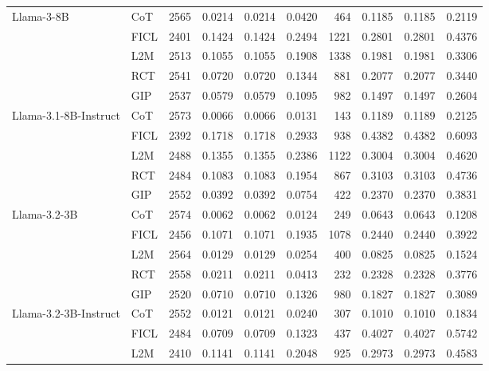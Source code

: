 \documentclass[conference]{IEEEtran}
\begin{document}
\begin{table}[t]
\begin{tabular}{@{} p{3.5cm} l r r r r r r r r@{}}
\addlinespace
Llama-3-8B                   & CoT & 2565 & 0.0214 & 0.0214 & 0.0420 & 464 & 0.1185 & 0.1185 & 0.2119 \\
                          & FICL & 2401 & 0.1424 & 0.1424 & 0.2494 & 1221 & 0.2801 & 0.2801 & 0.4376 \\
                          & L2M  & 2513 & 0.1055 & 0.1055 & 0.1908 & 1338 & 0.1981 & 0.1981 & 0.3306 \\
                          & RCT  & 2541 & 0.0720 & 0.0720 & 0.1344 & 881 & 0.2077 & 0.2077 & 0.3440 \\
                          & GIP  & 2537 & 0.0579 & 0.0579 & 0.1095 & 982 & 0.1497 & 0.1497 & 0.2604 \\ \hline
\addlinespace
Llama-3.1-8B-Instruct       & CoT & 2573 & 0.0066 & 0.0066 & 0.0131 & 143 & 0.1189 & 0.1189 & 0.2125 \\
                          & FICL & 2392 & 0.1718 & 0.1718 & 0.2933 & 938 & 0.4382 & 0.4382 & 0.6093 \\
                          & L2M  & 2488 & 0.1355 & 0.1355 & 0.2386 & 1122 & 0.3004 & 0.3004 & 0.4620 \\
                          & RCT  & 2484 & 0.1083 & 0.1083 & 0.1954 & 867 & 0.3103 & 0.3103 & 0.4736 \\
                          & GIP  & 2552 & 0.0392 & 0.0392 & 0.0754 & 422 & 0.2370 & 0.2370 & 0.3831 \\ \hline
\addlinespace
Llama-3.2-3B                 & CoT & 2574 & 0.0062 & 0.0062 & 0.0124 & 249 & 0.0643 & 0.0643 & 0.1208 \\
                          & FICL & 2456 & 0.1071 & 0.1071 & 0.1935 & 1078 & 0.2440 & 0.2440 & 0.3922 \\
                          & L2M  & 2564 & 0.0129 & 0.0129 & 0.0254 & 400 & 0.0825 & 0.0825 & 0.1524 \\
                          & RCT  & 2558 & 0.0211 & 0.0211 & 0.0413 & 232 & 0.2328 & 0.2328 & 0.3776 \\
                          & GIP  & 2520 & 0.0710 & 0.0710 & 0.1326 & 980 & 0.1827 & 0.1827 & 0.3089 \\ \hline
\addlinespace
Llama-3.2-3B-Instruct       & CoT & 2552 & 0.0121 & 0.0121 & 0.0240 & 307 & 0.1010 & 0.1010 & 0.1834 \\
                          & FICL & 2484 & 0.0709 & 0.0709 & 0.1323 & 437 & 0.4027 & 0.4027 & 0.5742 \\
                          & L2M  & 2410 & 0.1141 & 0.1141 & 0.2048 & 925 & 0.2973 & 0.2973 & 0.4583 \\

\end{tabular}
\end{table}
\end{document}
